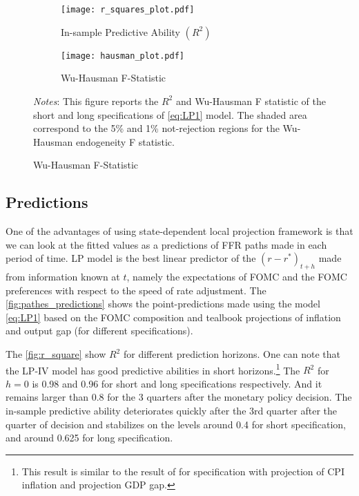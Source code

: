 \documentclass[11pt]{article}
\begin{document}
\begin{figure}\centering 
  \begin{minipage}{1\textwidth}\centering
    \caption{Additional Statistics for LP Models}
    \vspace{1ex}
    \begin{subfigure}[b]{0.495\textwidth}
      \caption{In-sample Predictive Ability $\left(R^2\right)$}
    \label{fig:r_square}
  \texttt{[image: r\_squares\_plot.pdf]}
    \end{subfigure}\hfill
    \begin{subfigure}[b]{0.495\textwidth}
      \caption{Wu-Hausman F-Statistic }
    \label{fig:WuHausman}
  \texttt{[image: hausman\_plot.pdf]}
    \end{subfigure}
  {\begin{flushleft}\scriptsize\textit{Notes}: This figure reports the $R^2$ and Wu-Hausman F statistic of the short and long specifications of \vref{eq:LP1} model. The shaded area correspond to the 5\% and 1\% not-rejection regions for the Wu-Hausman endogeneity F statistic. \end{flushleft}}
  \end{minipage}
\end{figure}


\subsection{Predictions}

One of the advantages of using state-dependent local projection framework is that we can look at the fitted values as a predictions of FFR paths made in each period of time.
LP model is the best linear predictor of the $\left(r-r^*\right)_{t+h}$ made from information known at $t$, namely the expectations of FOMC and the FOMC preferences with respect to the speed of rate adjustment. 
The \vref{fig:pathes_predictions} shows the point-predictions made using the model \vref{eq:LP1} based on the FOMC composition and tealbook projections of inflation and output gap (for different specifications). 

The \vref{fig:r_square} show $R^2$ for different prediction horizons. 
One can note that the LP-IV model has good predictive abilities in short horizons.\footnote{This result is similar to the result of \citet{Carvalho2021} for specification with projection of CPI inflation and projection GDP gap.}
The $R^2$ for $h=0$ is 0.98 and 0.96 for short and long specifications respectively. And it remains larger than 0.8 for the 3 quarters after the monetary policy decision.
The in-sample predictive ability deteriorates quickly after the 3rd quarter after the quarter of decision and stabilizes on the levels around 0.4 for short specification, and around 0.625 for long specification.
\end{document}
